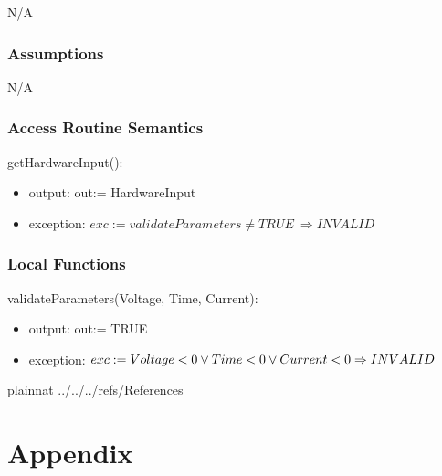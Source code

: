 \documentclass[12pt, titlepage]{article}
\begin{document}
N/A

\subsubsection{Assumptions}
N/A

\subsubsection{Access Routine Semantics}

\noindent getHardwareInput():
\begin{itemize}
\item output: out:= HardwareInput
\item exception: $exc:= 
validateParameters \ne TRUE \
\Rightarrow INVALID$
\end{itemize}


\subsubsection{Local Functions}
\noindent validateParameters(Voltage, Time, Current):
\begin{itemize}
\item output: out:= TRUE
\item exception: $exc:= 
Voltage < 0 \lor \\
Time < 0 \lor Current < 0 \\
\Rightarrow INVALID$
\end{itemize}
\newpage

 {plainnat}
 {../../../refs/References}

\newpage

\section{Appendix} \label{Appendix}
\end{document}
